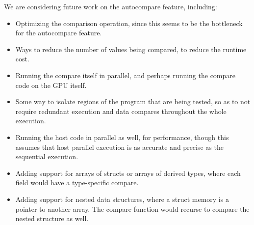 We are considering future work on the autocompare feature, including:
\begin{itemize}
\item Optimizing the comparison operation, since this seems to be the bottleneck for the autocompare feature.
\item Ways to reduce the number of values being compared, to reduce the runtime cost.
\item Running the compare itself in parallel, and perhaps running the compare code on the GPU itself.
\item Some way to isolate regions of the program that are being tested, so as to not require redundant execution and data compares throughout the whole execution.
\item Running the host code in parallel as well, for performance, though this assumes that host parallel execution is as accurate and precise as the sequential execution.
\item Adding support for arrays of structs or arrays of derived types, where each field would have a type-specific compare.
\item Adding support for nested data structures, where a struct memory is a pointer to another array.
The compare function would recurse to compare the nested structure as well.
\end{itemize}
